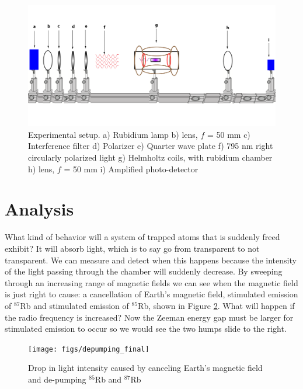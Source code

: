 \begin{figure}[H]
  \includegraphics[totalheight=0.5\textwidth]{figs/apparatus}
  \caption{Experimental setup. \newline
a) Rubidium lamp \newline
b) lens, $f$ = 50 mm \newline
c) Interference filter \newline
d) Polarizer \newline
e) Quarter wave plate \newline
f) 795 nm right circularly polarized light \newline
g) Helmholtz coils, with rubidium chamber \newline
h) lens, $f$ = 50 mm \newline
i) Amplified photo-detector}
  \label{schematic}
\end{figure}


\section{Analysis}
What kind of behavior will a system of trapped atoms that is suddenly freed exhibit? It will absorb light, which is to say go from transparent to not transparent. We can measure and detect when this happens because the intensity of the light passing through the chamber will suddenly decrease. By sweeping through an increasing range of magnetic fields we can see when the magnetic field is just right to cause: a cancellation of Earth's magnetic field, stimulated emission of  $^{87}$Rb and stimulated emission of $^{85}$Rb, shown in Figure \ref{depumping}. What will happen if the radio frequency is increased? Now the Zeeman energy gap must be larger for stimulated emission to occur so we would see the two humps slide to the right.
\begin{figure}[H]
  \texttt{[image: figs/depumping\_final]}
  \caption{Drop in light intensity caused by canceling Earth's magnetic field and de-pumping $^{85}$Rb and $^{87}$Rb}
  \label{depumping}
\end{figure}

